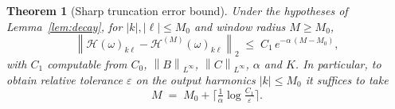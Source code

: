 \documentclass{amsart}
\newtheorem{theorem}{Theorem}
\theoremstyle{definition}
\newcommand{\norm}[1]{\left\lVert#1\right\rVert}
\newcommand{\Hcal}{\mathcal{H}}
\begin{document}
\begin{theorem}[Sharp truncation error bound]\label{thm:trunc}
Under the hypotheses of Lemma~\ref{lem:decay}, for $|k|,|\ell|\le M_0$ and
window radius $M\ge M_0$,
\begin{equation}\label{eq:trerr}
\norm{\Hcal(\omega)_{k\ell}-\Hcal^{(M)}(\omega)_{k\ell}}_2
\;\le\; C_1\,e^{-\alpha\,(M-M_0)},
\end{equation}
with $C_1$ computable from
$C_0$, $\norm{B}_{L^\infty}$, $\norm{C}_{L^\infty}$, $\alpha$ and $K$. In
particular, to obtain relative tolerance $\varepsilon$ on the output harmonics
$|k|\le M_0$ it suffices to take
\begin{equation}\label{eq:Mchoice}
M\;=\;M_0+\Big\lceil \tfrac1\alpha\log\tfrac{C_1}{\varepsilon}\Big\rceil .
\end{equation}
\end{theorem}
\end{document}
